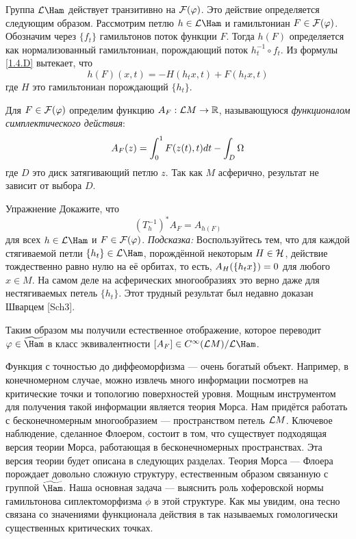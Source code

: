 Группа $\L\Ham$ действует транзитивно на $\mathcal{F}(\varphi)$. Это
действие определяется следующим образом. Рассмотрим петлю $h\in\L\Ham$ и
гамильтониан $F\in\mathcal{F}(\varphi)$. Обозначим через $\{f_{t}\}$
гамильтонов поток функции $F$.
Тогда $h(F)$ определяется как нормализованный гамильтониан, порождающий поток
$h^{-1}_{t}\circ f_{t}$.
Из формулы \ref{1.4.D} вытекает, что
\[
h(F)(x,t) = -H(h_{t}x,t) + F(h_{t}x,t)
\]
где $H$ это гамильтониан порождающий $\{h_{t}\}$.

Для $F\in\mathcal{F}(\varphi)$ определим функцию $A_{F}:\mathcal{L} M\to\mathbb{R}$,
называющуюся \textit{функционалом симплектического действия}:
\[
A_{F}(z)=\int_{0}^{1}F(z(t),t)d t - \int_{D}\Omega
\]
где $D$ это диск затягивающий петлю $z$.
Так как $M$ асферично, результат не зависит от выбора $D$.

\begin{ex}{Упражнение}\label{13.1.A}
Докажите, что
\[
(T_{h}^{-1})^{*}A_{F}= A _{h(F)}
\]
для всех $h\in\L\Ham$ и $F\in\mathcal{F}(\varphi)$.
\textit{Подсказка:}
Воспользуйтесь тем, что для каждой стягиваемой петли $\{h_{t}\}\in\L\Ham$, порождённой некоторым $H\in\mathcal{H}$, действие тождественно равно нулю на её орбитах, то есть, $A_{H}(\{h_{t}x\}) \z= 0$ для любого $x\in M$.
На самом деле на асферических многообразиях это верно даже для нестягиваемых петель $\{h_{t}\}$.
Этот трудный результат был недавно доказан Шварцем [Sch3].
\end{ex}

Таким образом мы получили естественное отображение, которое переводит
$\phi\in\widetilde\Ham$ в класс эквивалентности $[A_{F}]\in C^{\infty} (\L M)/\L\Ham$.

Функция с точностью до диффеоморфизма — очень богатый объект.
Например, в конечномерном случае, можно извлечь много информации посмотрев на критические точки и топологию поверхностей уровня.
Мощным инструментом для получения такой информации является теория Морса.
Нам придётся работать с бесконечномерным многообразием — пространством петель $\mathcal{L} M$.
Ключевое наблюдение, сделанное Флоером, состоит в том, что существует подходящая версия теории Морса, работающая в бесконечномерных пространствах.
Эта версия теории будет описана в следующих разделах.
Теория Морса — Флоера порождает довольно сложную структуру, естественным образом связанную 
с группой $\widetilde\Ham$.
Наша основная задача — выяснить роль
хоферовской нормы гамильтонова сиплектоморфизма $\phi$ в этой структуре.
Как мы увидим, она тесно связана со значениями функционала действия
в так называемых гомологически существенных критических точках. 

